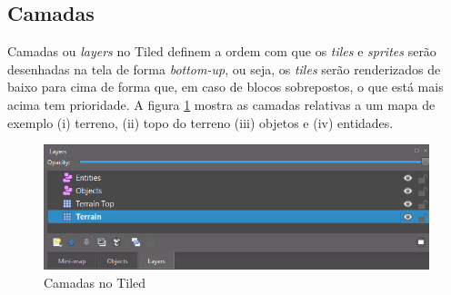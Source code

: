 
\subsection{Camadas}
\label{sec:camadas}
Camadas ou \textit{layers} no Tiled definem a ordem com que os \textit{tiles} e \textit{sprites} serão desenhadas na tela de forma \textit{bottom-up}, ou seja, os \textit{tiles} serão renderizados de baixo para cima de forma que, em caso de blocos sobrepostos, o que está mais acima tem prioridade. A figura \ref{fig:layers} mostra as camadas relativas a um mapa de exemplo (i) terreno, (ii) topo do terreno (iii) objetos e (iv) entidades. 
\begin{figure}[h!]
    \centering
    \includegraphics[width=1\linewidth]{figuras/layers.png}
    \caption{Camadas no Tiled}
    \label{fig:layers}
\end{figure}

